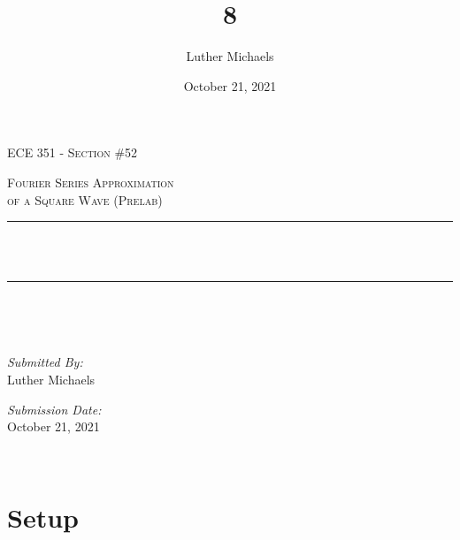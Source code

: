 \documentclass[12pt]{report}
\title{8}	%
\author{Luther Michaels}	%
\date{October 21, 2021}   %
\makeatletter
\let\thetitle\@title
\makeatother
\begin{document}
	
\begin{titlepage}
	\centering
	\vspace*{0.5 cm}
		
	\begin{center}    
		\textsc{\Large   ECE 351 - Section \#52}\\[2.0 cm]	
	\end{center}  
	\textsc{\Large Fourier Series Approximation \\ of a Square Wave (Prelab)  }\\[0.5 cm]
	\rule{\linewidth}{0.2 mm} \\[0.4 cm]
	{ \huge \bfseries \thetitle}\\
	\rule{\linewidth}{0.2 mm} \\[1.5 cm]
	\begin{minipage}{0.4\textwidth}
		\begin{flushleft} \large
		\end{flushleft}
	\end{minipage}~
	\begin{minipage}{0.4\textwidth}
		\begin{flushright} \large
			\emph{Submitted By:} \\
			Luther Michaels \break
				
			\emph{Submission Date:} \\
			October 21, 2021
		\end{flushright}
	\end{minipage}\\[2 cm]
\end{titlepage}
	
\renewcommand{\thesection}{\arabic{section}}
	
\section{Setup}
	
\end{document}
